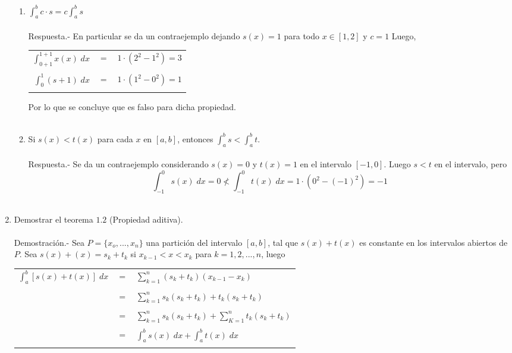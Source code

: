 \begin{enumerate}
\begin{enumerate}[\bfseries (a)]
	\item $\displaystyle\int_{a}^{b} c\cdot s = c\int_{a}^{b} s$\\\\
	    Respuesta.-\; En particular se da un contraejemplo dejando $s(x)=1$ para todo $x\in [1,2]$ y $c=1$ Luego,
	    \begin{center}
		\begin{tabular}{rcc}
		    $\displaystyle\int_{0+1}^{1+1} x(x) \;dx$&$=$&$1\cdot(2^2 - 1^2) = 3$\\\\
		    $\displaystyle\int_{0}^{1} (s+1) \;dx$&$=$&$1\cdot (1^2 - 0^2) = 1$\\\\
		\end{tabular}
	    \end{center}
	    Por lo que se concluye que es falso para dicha propiedad.\\\\

	\item Si $s(x)<t(x)$ para cada $x$ en $[a,b]$, entonces $\displaystyle\int_{a}^{b} s < \int_{a}^{b} t.$\\\\
	    Respuesta.-\; Se da un contraejemplo considerando $s(x)=0$ y $t(x)=1$ en el intervalo $[-1,0]$. Luego $s<t$ en el intervalo, pero $$\displaystyle\int_{-1}^{0} s(x) \;dx = 0 \not< \int_{-1}^{0} t(x) \; dx = 1\cdot(0^2 - (-1)^2) = -1$$\\

    \end{enumerate}

    \item Demostrar el teorema $1.2$ (Propiedad aditiva).\\\\
	Demostración.-\; Sea $P=\lbrace x_o,...,x_n \rbrace$ una partición del intervalo $[a,b]$, tal que $s(x) + t(x)$ es constante en los intervalos abiertos de $P$. Sea $s(x)+(x)=s_k + t_k$ si $x_{k-1}<x<x_k$ para $k=1,2,...,n$, luego
	\begin{center}
	    \begin{tabular}{rcl}
		$\displaystyle\int_{a}^{b} \left[ s(x) + t(x) \right] \; dx$&$=$&$\sum\limits_{k=1}^n (s_k + t_k)(x_{k-1} - x_k)$\\\\
		&$=$&$\sum\limits_{k=1}^n s_k(s_k + t_k) + t_k(s_k + t_k)$\\\\
		&$=$&$\sum\limits_{k=1}^n s_k(s_k + t_k) + \sum\limits_{K=1}^n t_k(s_k + t_k)$\\\\
		&$=$&$\displaystyle\int_{a}^{b} s(x) \; dx + \int_a^b t(x) \; dx$\\\\
	    \end{tabular}
	\end{center}


\end{enumerate}
